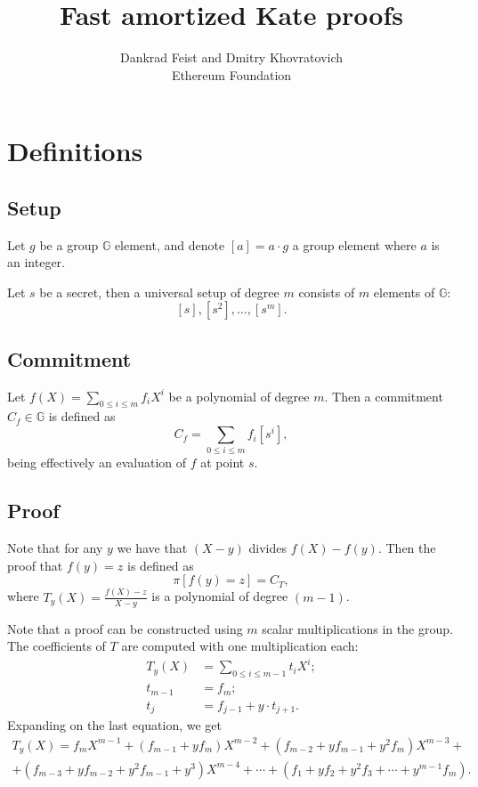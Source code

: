\documentclass[a4paper]{article}
\title{Fast amortized Kate proofs}
\author{Dankrad Feist and Dmitry Khovratovich \\Ethereum Foundation}
\begin{document}
\maketitle

\section{Definitions}

\subsection{Setup}

Let $g$ be a group $\mathbb{G}$ element, and denote $[a] = a\cdot g$ a group element where $a$ is an integer. 

Let $s$ be a secret, then a universal setup of degree $m$ consists of  $m$ elements of $\mathbb{G}$:
$$
[s], [s^2], \ldots, [s^m].
$$


\subsection{Commitment}
Let $f(X) = \sum_{0\leq i \leq m}f_i X^i$ be a polynomial of degree $m$. Then a commitment $C_f\in \mathbb{G}$ is defined as
$$
C_f = \sum_{0\leq i \leq m} f_i[s^i],
$$
being effectively an evaluation of $f$ at point $s$.

\subsection{Proof}
Note that for any $y$ we have that $(X-y)$ divides $f(X) - f(y)$. Then the proof that $f(y) = z$ is defined as
$$
\pi[f(y)=z] = C_T,
$$
where $T_y(X) = \frac{f(X)-z}{X-y}$ is a polynomial of degree $(m-1)$.

Note that a proof can be constructed using $m$ scalar multiplications in the group. The coefficients of $T$ are computed with one multiplication each:
\begin{align}
    T_y(X) &= \sum_{0\leq i \leq m-1}t_i X^i;\\
    t_{m-1} &= f_m;\\
    t_j &= f_{j-1}+y\cdot t_{j+1} .
\end{align}
Expanding on the last equation, we get
\begin{multline}
T_y(X) =f_mX^{m-1} + (f_{m-1}+yf_{m})X^{m-2} + (f_{m-2}+yf_{m-1}+y^2f_m)X^{m-3} +\\+
(f_{m-3}+yf_{m-2}+y^2f_{m-1}+y^3)X^{m-4}+\cdots +  (f_{1}+yf_{2}+y^2f_3+\cdots+y^{m-1}f_m).
\end{multline}
\end{document}

